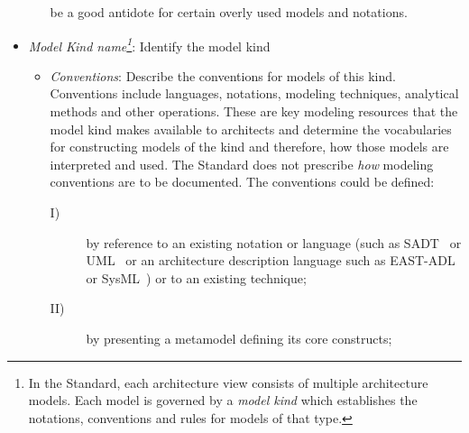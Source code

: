 \begin{itemize}
\begin{itemize}
be a good antidote for certain overly used models and notations.
\end{itemize}
\item {\em Model Kind name\footnote{In the Standard, each architecture view consists of multiple
architecture models. Each model is governed by a \textit{model kind}
which establishes the notations, conventions and rules for models of
that type.}}:  Identify the model kind
\begin{itemize}
\item {\em Conventions}: Describe the conventions for models of this kind. Conventions include languages, notations, modeling techniques,
analytical methods and other operations. These are key modeling
resources that the model kind makes available to architects and
determine the vocabularies for constructing models of the kind and
therefore, how those models are interpreted and used.
The Standard does not prescribe \emph{how} modeling conventions are to
be documented.  The conventions could be defined:
\begin{description}
\item[I)] by reference to an existing notation or language (such as
  SADT~\cite{SADT} or UML~\cite{UML} or an architecture description language such as EAST-ADL~\cite{EAST-ADL}
  or SysML~\cite{SysML}) or to an existing technique;
\item[II)] by presenting a metamodel defining its core constructs;

\end{description}
\end{itemize}
\end{itemize}
